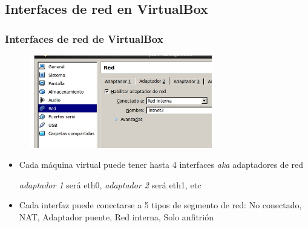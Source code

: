 \documentclass[ucs]{beamer}
\begin{document}
%
%
%

%


\subsection{Interfaces de red en VirtualBox}

\begin{frame}[fragile]
\frametitle{Interfaces de red de VirtualBox}
\begin{center}
\begin{figure}
\includegraphics[width=8cm]{figs/vbox02}
\end{figure}
\end{center}
\begin{itemize}
\item
Cada máquina virtual puede tener hasta 4 interfaces \emph{aka} adaptadores de red

\emph{adaptador 1} será eth0, \emph{adaptador 2} será eth1, etc
\item
Cada interfaz puede conectarse a 5 tipos de segmento de red: No conectado,
NAT, Adaptador puente, Red interna, Solo anfitrión
\end{itemize}
\end{frame}
\end{document}
